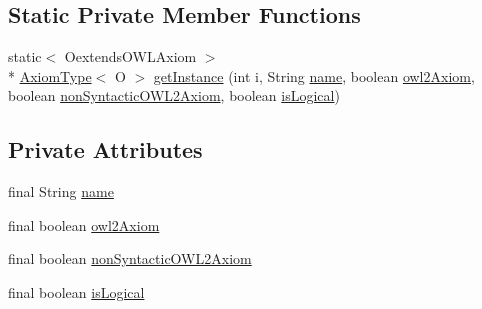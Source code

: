\subsection*{Static Private Member Functions}
\begin{DoxyCompactItemize}
\item 
static$<$ Oextends\-O\-W\-L\-Axiom $>$\\*
 \hyperlink{classorg_1_1semanticweb_1_1owlapi_1_1model_1_1_axiom_type_3_01_c_01extends_01_o_w_l_axiom_01_4_af3ef15094af1800e34dd66f6289c3631}{Axiom\-Type}$<$ O $>$ \hyperlink{classorg_1_1semanticweb_1_1owlapi_1_1model_1_1_axiom_type_3_01_c_01extends_01_o_w_l_axiom_01_4_a485e011845434c518471707a87f09339}{get\-Instance} (int i, String \hyperlink{classorg_1_1semanticweb_1_1owlapi_1_1model_1_1_axiom_type_3_01_c_01extends_01_o_w_l_axiom_01_4_aafd56e46de36875cc5820c9bf846f0ec}{name}, boolean \hyperlink{classorg_1_1semanticweb_1_1owlapi_1_1model_1_1_axiom_type_3_01_c_01extends_01_o_w_l_axiom_01_4_a281c9ecdd09c17b5db7cff2d3318d033}{owl2\-Axiom}, boolean \hyperlink{classorg_1_1semanticweb_1_1owlapi_1_1model_1_1_axiom_type_3_01_c_01extends_01_o_w_l_axiom_01_4_ae8647a8472e7f3b71d5c737b3206c2bf}{non\-Syntactic\-O\-W\-L2\-Axiom}, boolean \hyperlink{classorg_1_1semanticweb_1_1owlapi_1_1model_1_1_axiom_type_3_01_c_01extends_01_o_w_l_axiom_01_4_aa4e0289ae43dbf8861d7aa85e099d74a}{is\-Logical})
\end{DoxyCompactItemize}
\subsection*{Private Attributes}
\begin{DoxyCompactItemize}
\item 
final String \hyperlink{classorg_1_1semanticweb_1_1owlapi_1_1model_1_1_axiom_type_3_01_c_01extends_01_o_w_l_axiom_01_4_aafd56e46de36875cc5820c9bf846f0ec}{name}
\item 
final boolean \hyperlink{classorg_1_1semanticweb_1_1owlapi_1_1model_1_1_axiom_type_3_01_c_01extends_01_o_w_l_axiom_01_4_a281c9ecdd09c17b5db7cff2d3318d033}{owl2\-Axiom}
\item 
final boolean \hyperlink{classorg_1_1semanticweb_1_1owlapi_1_1model_1_1_axiom_type_3_01_c_01extends_01_o_w_l_axiom_01_4_ae8647a8472e7f3b71d5c737b3206c2bf}{non\-Syntactic\-O\-W\-L2\-Axiom}
\item 
final boolean \hyperlink{classorg_1_1semanticweb_1_1owlapi_1_1model_1_1_axiom_type_3_01_c_01extends_01_o_w_l_axiom_01_4_aa4e0289ae43dbf8861d7aa85e099d74a}{is\-Logical}
\end{DoxyCompactItemize}
